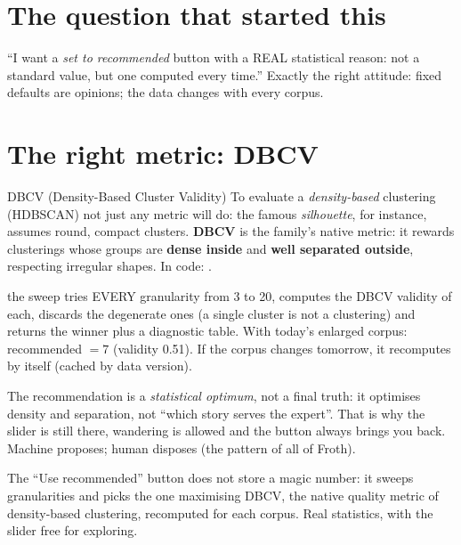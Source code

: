 \documentclass[11pt,a4paper]{article}
\begin{document}

\section{The question that started this}

``I want a \emph{set to recommended} button with a REAL statistical reason: not a standard
value, but one computed every time.'' Exactly the right attitude: fixed defaults are opinions;
the data changes with every corpus.

\section{The right metric: DBCV}

\begin{concepto}{DBCV (Density-Based Cluster Validity)}
To evaluate a \emph{density-based} clustering (HDBSCAN) not just any metric will do: the famous
\emph{silhouette}, for instance, assumes round, compact clusters. \textbf{DBCV} is the family's
native metric: it rewards clusterings whose groups are \textbf{dense inside} and
\textbf{well separated outside}, respecting irregular shapes.
In code: .
\end{concepto}

\begin{concepto}{the sweep}
 tries EVERY granularity from 3 to 20, computes
the DBCV validity of each, discards the degenerate ones (a single cluster is not a clustering)
and returns the winner plus a diagnostic table. With today's enlarged corpus: recommended
$= 7$ (validity 0.51). If the corpus changes tomorrow, it recomputes by itself (cached by data
version).
\end{concepto}

\begin{ojo}
The recommendation is a \emph{statistical optimum}, not a final truth: it optimises density and
separation, not ``which story serves the expert''. That is why the slider is still there,
wandering is allowed and the button always brings you back. Machine proposes; human disposes
(the pattern of all of Froth).
\end{ojo}

\begin{resumen}
The ``Use recommended'' button does not store a magic number: it sweeps granularities and picks
the one maximising DBCV, the native quality metric of density-based clustering, recomputed for
each corpus. Real statistics, with the slider free for exploring.
\end{resumen}
\end{document}
